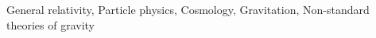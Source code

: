 \documentclass[twocolumn]{aastex631}
\begin{document}
General relativity, Particle physics, Cosmology, Gravitation, Non-standard theories of gravity
\end{document}

